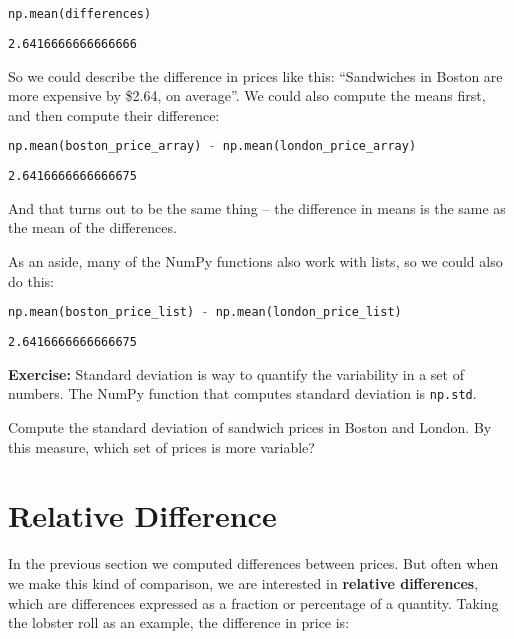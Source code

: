 \begin{lstlisting}[language=Python,style=source]
np.mean(differences)
\end{lstlisting}

\begin{lstlisting}[style=output]
2.6416666666666666
\end{lstlisting}

So we could describe the difference in prices like this: ``Sandwiches in
Boston are more expensive by \$2.64, on average''. We could also compute
the means first, and then compute their difference:

\begin{lstlisting}[language=Python,style=source]
np.mean(boston_price_array) - np.mean(london_price_array)
\end{lstlisting}

\begin{lstlisting}[style=output]
2.6416666666666675
\end{lstlisting}

And that turns out to be the same thing -- the difference in means is
the same as the mean of the differences.

As an aside, many of the NumPy
functions also work with lists, so we could also do this:

\begin{lstlisting}[language=Python,style=source]
np.mean(boston_price_list) - np.mean(london_price_list)
\end{lstlisting}

\begin{lstlisting}[style=output]
2.6416666666666675
\end{lstlisting}

\textbf{Exercise:} Standard deviation is way to quantify the variability
in a set of numbers. The NumPy function that computes standard deviation
is \passthrough{\lstinline!np.std!}.

Compute the standard deviation of sandwich prices in Boston and London.
By this measure, which set of prices is more variable?

\section{Relative Difference}\label{relative-difference}

In the previous section we computed differences between prices. But
often when we make this kind of comparison, we are interested in
\textbf{relative differences}, which are differences expressed as a
fraction or percentage of a quantity. Taking the lobster roll as an
example, the difference in price is:

